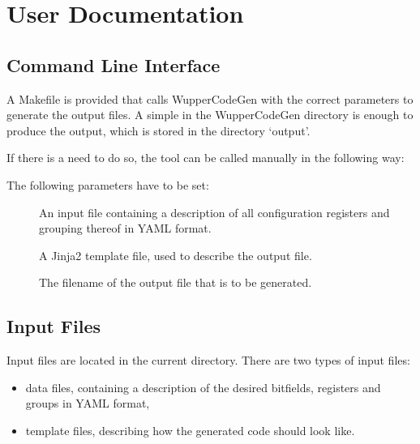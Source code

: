 \documentclass[letterpaper,10pt,english]{sphinxmanual}
\begin{document}
\section{User Documentation}
\label{\detokenize{user::doc}}\label{\detokenize{user:user-documentation}}

\subsection{Command Line Interface}
\label{\detokenize{user:command-line-interface}}
A Makefile is provided that calls WupperCodeGen with the correct parameters to
generate the output files. A simple  in the WupperCodeGen directory is
enough to produce the output, which is stored in the directory `output'.

If there is a need to do so, the tool can be called manually in the following way:

\begin{sphinxVerbatim}[commandchars=\\\{\}]
  \PYG{p}{[}\PYG{p}{]} \PYG{p}{[}\PYG{p}{]}   
\end{sphinxVerbatim}

The following parameters have to be set:
\begin{description}
\item[{}] \leavevmode
An input file containing a description of all configuration registers and
grouping thereof in YAML format.

\item[{}] \leavevmode
A Jinja2 template file, used to describe the output file.

\item[{}] \leavevmode
The filename of the output file that is to be generated.

\end{description}


\subsection{Input Files}
\label{\detokenize{user:input-files}}
Input files are located in the current directory. There are two types of input files:
\begin{itemize}
\item {} 
data files, containing a description of the desired bitfields, registers and groups in YAML format,

\item {} 
template files, describing how the generated code should look like.

\end{itemize}
\end{document}
